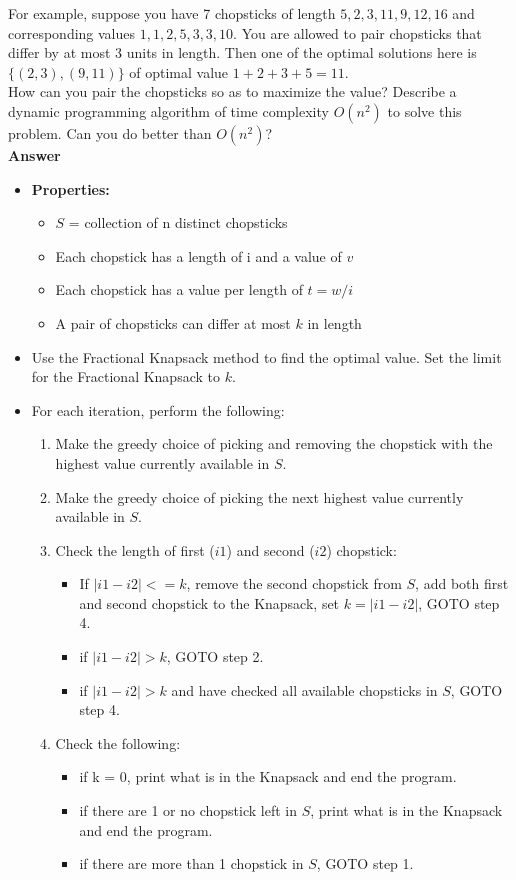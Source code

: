 \documentclass{article}
\begin{document}
\noindent For example, suppose you have 7 chopsticks of length
$5,2,3,11,9,12,16$ and corresponding values $1,1,2,5,3,3,10$. You are
allowed to pair chopsticks that differ by at most 3 units in
length. Then one of the optimal solutions here is $\{ (2,3),(9,11) \}$
of optimal value $1+2+3+5=11$.\\

\noindent How can you pair the chopsticks so as to maximize the value?
Describe a dynamic programming algorithm of time complexity $O(n^{2})$
to solve this problem. Can you do better than $O(n^{2})$?\\

\textbf{ Answer }
\begin{itemize}
\item {\bf Properties: }
\begin{itemize}
\item $S$ = collection of n distinct chopsticks
\item Each chopstick has a length of i and a value of $v$
\item Each chopstick has a value per length of $t = w/i$
\item A pair of chopsticks can differ at most $k$ in length
\end{itemize}

\item Use the Fractional Knapsack method to find the optimal value. Set the limit for the Fractional Knapsack to $k$.
\item For each iteration, perform the following:
\begin{enumerate}
\item Make the greedy choice of picking and removing the chopstick with the highest value currently available in $S$.
\item Make the greedy choice of picking the next highest value currently available in $S$.
\item Check the length of first ($i1$) and second ($i2$) chopstick:
\begin{itemize}
\item If $| i1 - i2 | <= k$, remove the second chopstick from $S$, add both first and second chopstick to the Knapsack, set $k = | i1 - i2 |$, GOTO step 4.
\item if $| i1 - i2 | > k$, GOTO step 2.
\item if $| i1 - i2 | > k$ and have checked all available chopsticks in $S$, GOTO step 4.
\end{itemize}
\item Check the following:
\begin{itemize}
\item if k = 0, print what is in the Knapsack and end the program.
\item if there are 1 or no chopstick left in $S$, print what is in the Knapsack and end the program.
\item if there are more than 1 chopstick in $S$, GOTO step 1.
\end{itemize}
\end{enumerate}


\end{itemize}
\end{document}
